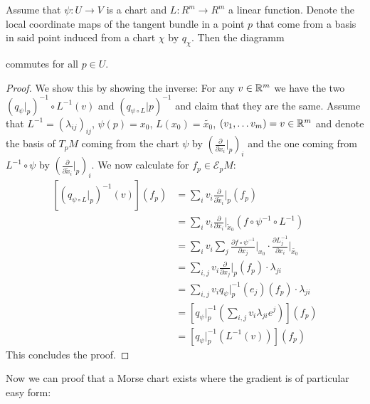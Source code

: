 \begin{lemma} \label{lem: linear chart change and tangend basis change}
Assume that $\psi:U\to V$ is a chart and $L:R^m\to R^m$ a linear function. Denote the local coordinate maps of the tangent bundle in a point $p$ that come from a basis in said point induced from a chart $\chi$ by $q_{\chi}$.
Then the diagramm \begin{center}
\end{center}  
commutes for all $p\in U$.
\end{lemma}
\begin{proof}
We show this by showing the inverse: For any $v\in \mathbb{R}^m$ we have the two $(q_{\psi} \big|_p)^{-1} \circ  L^{-1}(v)$ and $(q_{\psi \circ L}\big|p)^{-1}$ and claim that they are the same. Assume that $L^{-1}=(\lambda_{ij})_{ij}$, $\psi(p)=x_0$, $L(x_0)=\tilde{x_0}$, $(v_1,\dots v_m)=v\in \mathbb{R}^m$ and denote the basis of $T_pM$ coming from the chart $\psi$ by $\left(\frac{\partial}{\partial x_i}\big|_p \right)_i$ and the one coming from $L^{-1}\circ \psi$ by $\left(\frac{\partial}{\partial \tilde{x}_i}\big|_p \right)_i$. We now calculate for $f_p\in \mathcal{E}_pM$:
\begin{align*}
	\left[(q_{\psi \circ L}\big|_p)^{-1}(v)\right](f_p)
	&= \sum_i v_i \frac{\partial}{\partial \tilde{x}_i}\big|_p (f_p)  \\
	&=\sum_i v_i \frac{\partial}{\partial x_i}\big|_{\tilde{x}_0} (f\circ \psi^{-1}\circ L^{-1}) \\
	&=\sum_{i}v_i \sum_{j} \frac{\partial f\circ \psi^{-1}	}{\partial x_j}\big|_{x_0} \cdot \frac{\partial L^{-1}_j}{\partial x_i}\big|_{\tilde{x_0}}\\
	&= \sum_{i,j}v_i \frac{\partial }{\partial x_j}\big|_{p}(f_p) \cdot \lambda_{ji}\\
	&= \sum_{i,j}v_i q_{\psi}\big|_p^{-1}(e_j)(f_p) \cdot \lambda_{ji}\\
	&= \left[q_{\psi}\big|_p^{-1}(\sum_{i,j} v_i \lambda_{ji} e^j)\right](f_p)\\
	&= \left[q_{\psi}\big|_p^{-1}(L^{-1}(v))\right](f_p)
\end{align*}
This concludes the proof.
\end{proof}
Now we can proof that a Morse chart exists where the gradient is of particular easy form: 


